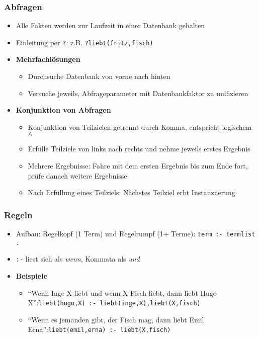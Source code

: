 \subsubsection{Abfragen}
\begin{itemize}
	\item Alle Fakten werden zur Laufzeit in einer Datenbank gehalten
	\item Einleitung per \texttt{?}: z.B. \texttt{?liebt(fritz,fisch)}
	\item \textbf{Mehrfachlösungen}
	\begin{itemize}
		\item Durchsuche Datenbank von vorne nach hinten
		\item Versuche jeweils, Abfrageparameter mit Datenbankfaktor zu unifizieren
	\end{itemize}
	\item \textbf{Konjunktion von Abfragen}
	\begin{itemize}
		\item Konjunktion von Teilzielen getrennt durch Komma, entspricht logischem \(\wedge\)
		\item Erfülle Teilziele von links nach rechts und nehme jeweils erstes Ergebnis
		\item Mehrere Ergebnisse: Fahre mit dem ersten Ergebnis bis zum Ende fort, prüfe danach weitere Ergebnisse
		\item Nach Erfüllung eines Teilziels: Nächstes Teilziel erbt Instanziierung
	\end{itemize}
\end{itemize}

\subsubsection{Regeln}
\begin{itemize}
	\item Aufbau: Regelkopf (1 Term) und Regelrumpf (1+ Terme): \texttt{term :- termlist .}
	\item \texttt{:-} liest sich als \textit{wenn}, Kommata als \textit{und}
	\item \textbf{Beispiele}
	\begin{itemize}
		\item "`Wenn Inge X liebt und wenn X Fisch liebt, dann liebt Hugo X"':\newline\texttt{liebt(hugo,X) :- liebt(inge,X),liebt(X,fisch)}
		\item "`Wenn es jemanden gibt, der Fisch mag, dann liebt Emil Erna"':\newline\texttt{liebt(emil,erna) :- liebt(X,fisch)}
	\end{itemize}
\end{itemize}

